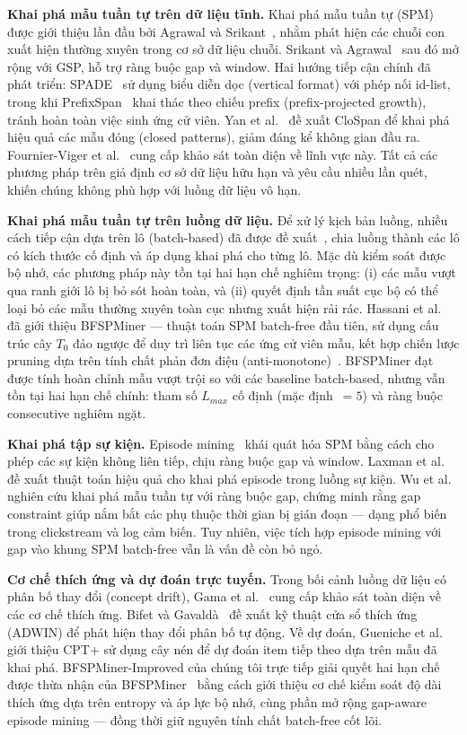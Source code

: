 \documentclass{article}
\begin{document}
\textbf{Khai phá mẫu tuần tự trên dữ liệu tĩnh.} Khai phá mẫu tuần tự (SPM) được giới thiệu lần đầu bởi Agrawal và Srikant~\cite{agrawal1995}, nhằm phát hiện các chuỗi con xuất hiện thường xuyên trong cơ sở dữ liệu chuỗi. Srikant và Agrawal~\cite{srikant1996} sau đó mở rộng với GSP, hỗ trợ ràng buộc gap và window. Hai hướng tiếp cận chính đã phát triển: SPADE~\cite{zaki2001} sử dụng biểu diễn dọc (vertical format) với phép nối id-list, trong khi PrefixSpan~\cite{pei2001} khai thác theo chiếu prefix (prefix-projected growth), tránh hoàn toàn việc sinh ứng cử viên. Yan et al.~\cite{yan2003} đề xuất CloSpan để khai phá hiệu quả các mẫu đóng (closed patterns), giảm đáng kể không gian đầu ra. Fournier-Viger et al.~\cite{fournier2017} cung cấp khảo sát toàn diện về lĩnh vực này. Tất cả các phương pháp trên giả định cơ sở dữ liệu hữu hạn và yêu cầu nhiều lần quét, khiến chúng không phù hợp với luồng dữ liệu vô hạn.

\textbf{Khai phá mẫu tuần tự trên luồng dữ liệu.} Để xử lý kịch bản luồng, nhiều cách tiếp cận dựa trên lô (batch-based) đã được đề xuất~\cite{marascu2006, ho2005}, chia luồng thành các lô có kích thước cố định và áp dụng khai phá cho từng lô. Mặc dù kiểm soát được bộ nhớ, các phương pháp này tồn tại hai hạn chế nghiêm trọng: (i) các mẫu vượt qua ranh giới lô bị bỏ sót hoàn toàn, và (ii) quyết định tần suất cục bộ có thể loại bỏ các mẫu thường xuyên toàn cục nhưng xuất hiện rải rác. Hassani et al.~\cite{hassani2019} đã giới thiệu BFSPMiner --- thuật toán SPM batch-free đầu tiên, sử dụng cấu trúc cây $T_0$ đảo ngược để duy trì liên tục các ứng cử viên mẫu, kết hợp chiến lược pruning dựa trên tính chất phản đơn điệu (anti-monotone)~\cite{agrawal1994}. BFSPMiner đạt được tính hoàn chỉnh mẫu vượt trội so với các baseline batch-based, nhưng vẫn tồn tại hai hạn chế chính: tham số $L_{max}$ cố định (mặc định~$= 5$) và ràng buộc consecutive nghiêm ngặt.

\textbf{Khai phá tập sự kiện.} Episode mining~\cite{mannila1997} khái quát hóa SPM bằng cách cho phép các sự kiện không liên tiếp, chịu ràng buộc gap và window. Laxman et al.~\cite{laxman2007} đề xuất thuật toán hiệu quả cho khai phá episode trong luồng sự kiện. Wu et al.~\cite{wu2013} nghiên cứu khai phá mẫu tuần tự với ràng buộc gap, chứng minh rằng gap constraint giúp nắm bắt các phụ thuộc thời gian bị gián đoạn --- dạng phổ biến trong clickstream và log cảm biến. Tuy nhiên, việc tích hợp episode mining với gap vào khung SPM batch-free vẫn là vấn đề còn bỏ ngỏ.

\textbf{Cơ chế thích ứng và dự đoán trực tuyến.} Trong bối cảnh luồng dữ liệu có phân bố thay đổi (concept drift), Gama et al.~\cite{gama2014} cung cấp khảo sát toàn diện về các cơ chế thích ứng. Bifet và Gavald\`{a}~\cite{bifet2007} đề xuất kỹ thuật cửa sổ thích ứng (ADWIN) để phát hiện thay đổi phân bố tự động. Về dự đoán, Gueniche et al.~\cite{gueniche2013} giới thiệu CPT+ sử dụng cây nén để dự đoán item tiếp theo dựa trên mẫu đã khai phá. BFSPMiner-Improved của chúng tôi trực tiếp giải quyết hai hạn chế được thừa nhận của BFSPMiner~\cite{hassani2019} bằng cách giới thiệu cơ chế kiểm soát độ dài thích ứng dựa trên entropy và áp lực bộ nhớ, cùng phần mở rộng gap-aware episode mining --- đồng thời giữ nguyên tính chất batch-free cốt lõi.
\end{document}
